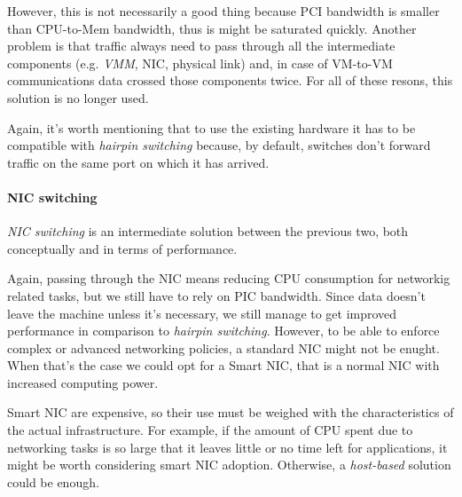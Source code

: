 \bigskip\noindent
\begin{minipage}{0.48\textwidth}
    However, this is not necessarily a good thing because PCI bandwidth is
    smaller than CPU-to-Mem bandwidth, thus is might be saturated quickly. Another
    problem is that traffic always need to pass through all the intermediate
    components (e.g. \emph{VMM}, NIC, physical link) and, in case of VM-to-VM
    communications data crossed those components twice. For all of these resons,
    this solution is no longer used.
\end{minipage}
\begin{minipage}{0.48\textwidth}
    \centering
\end{minipage}

\bigskip\noindent
Again, it's worth mentioning that to use the existing hardware it has to be
compatible with \emph{hairpin switching} because, by default, switches don't
forward traffic on the same port on which it has arrived.

\paragraph{NIC switching}
\emph{NIC switching} is an intermediate solution between the previous two, both
conceptually and in terms of performance.

\bigskip\noindent
\begin{minipage}{0.48\textwidth}
    Again, passing through the NIC means reducing CPU consumption for networkig
    related tasks, but we still have to rely on PIC bandwidth. Since data doesn't
    leave the machine unless it's necessary, we still manage to get improved
    performance in comparison to \emph{hairpin switching}. However, to be able
    to enforce complex or advanced networking policies, a standard NIC might not
    be enught. When that's the case we could opt for a Smart NIC, that is a
    normal NIC with increased computing power.
\end{minipage}
\hfill
\begin{minipage}{0.48\textwidth}
    \centering
\end{minipage}

\bigskip\noindent
Smart NIC are expensive, so their use must be weighed with the characteristics
of the actual infrastructure. For example, if the amount of CPU spent due to
networking tasks is so large that it leaves little or no time left for
applications, it might be worth considering smart NIC adoption. Otherwise, a
\emph{host-based} solution could be enough.

